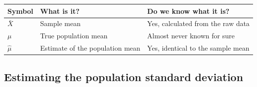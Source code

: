 \documentclass[]{book}
\begin{document}
\begin{longtable}[]{@{}lll@{}}
\toprule
\begin{minipage}[b]{0.30\columnwidth}\raggedright
Symbol\strut
\end{minipage} & \begin{minipage}[b]{0.30\columnwidth}\raggedright
What is it?\strut
\end{minipage} & \begin{minipage}[b]{0.30\columnwidth}\raggedright
Do we know what it is?\strut
\end{minipage}\tabularnewline
\midrule
\endhead
\begin{minipage}[t]{0.30\columnwidth}\raggedright
\(\bar{X}\)\strut
\end{minipage} & \begin{minipage}[t]{0.30\columnwidth}\raggedright
Sample mean\strut
\end{minipage} & \begin{minipage}[t]{0.30\columnwidth}\raggedright
Yes, calculated from the raw data\strut
\end{minipage}\tabularnewline
\begin{minipage}[t]{0.30\columnwidth}\raggedright
\(\mu\)\strut
\end{minipage} & \begin{minipage}[t]{0.30\columnwidth}\raggedright
True population mean\strut
\end{minipage} & \begin{minipage}[t]{0.30\columnwidth}\raggedright
Almost never known for sure\strut
\end{minipage}\tabularnewline
\begin{minipage}[t]{0.30\columnwidth}\raggedright
\(\hat{\mu}\)\strut
\end{minipage} & \begin{minipage}[t]{0.30\columnwidth}\raggedright
Estimate of the population mean\strut
\end{minipage} & \begin{minipage}[t]{0.30\columnwidth}\raggedright
Yes, identical to the sample mean\strut
\end{minipage}\tabularnewline
\bottomrule
\end{longtable}

\hypertarget{estimating-the-population-standard-deviation}{%
\subsection{Estimating the population standard deviation}\label{estimating-the-population-standard-deviation}}
\end{document}
